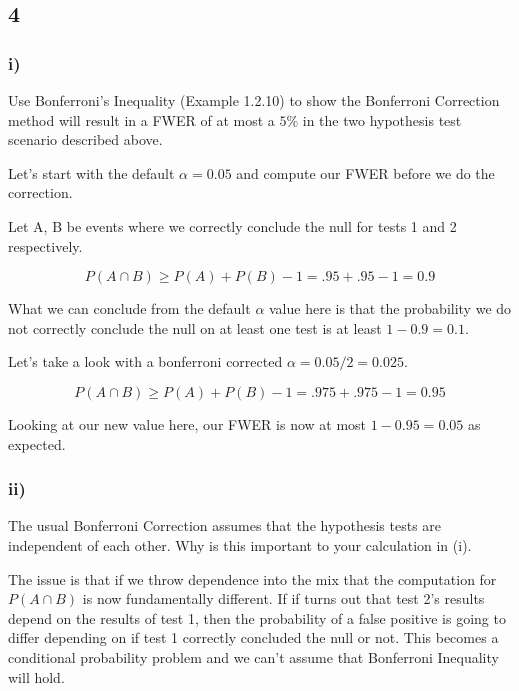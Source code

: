 \subsection*{4}

\subsubsection*{i)}

Use Bonferroni's Inequality (Example 1.2.10) to show the Bonferroni Correction method will result in a FWER of at most a $5\%$ in the two hypothesis test scenario described above.

Let's start with the default $\alpha = 0.05$ and compute our FWER before we do the correction.

Let A, B be events where we correctly conclude the null for tests 1 and 2 respectively.

\[
	P(A \cap B) \geq P(A) + P(B) - 1 = .95 + .95 - 1 = 0.9
\]

What we can conclude from the default $\alpha$ value here is that the probability we do not correctly conclude the null on at least one test is at least $1 - 0.9 = 0.1$. 

Let's take a look with a bonferroni corrected $\alpha = 0.05/2 = 0.025$. 

\[
	P(A \cap B) \geq P(A) + P(B) - 1 = .975 + .975 - 1 = 0.95
\]

Looking at our new value here, our FWER is now at most $1 - 0.95 = 0.05$ as expected.

\subsubsection*{ii)}

The usual Bonferroni Correction assumes that the hypothesis tests are independent of each other. Why is this important to your calculation in (i).

The issue is that if we throw dependence into the mix that the computation for $P(A \cap B)$ is now fundamentally different. If if turns out that test 2's results depend on the results of test 1, then the probability of a false positive is going to differ depending on if test 1 correctly concluded the null or not. This becomes a conditional probability problem and we can't assume that Bonferroni Inequality will hold.
